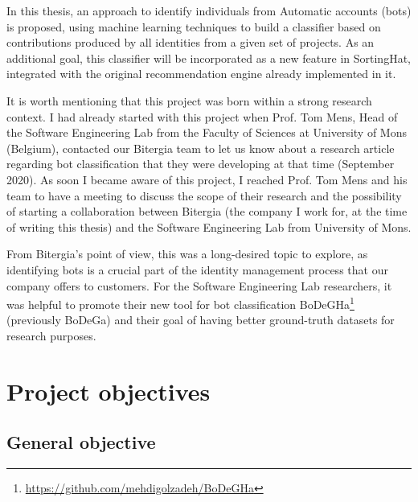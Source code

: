 \documentclass[a4paper, 12pt]{book}
\begin{document}
In this thesis, an approach to identify individuals from Automatic accounts (bots) is proposed, using machine learning techniques to build a classifier based on contributions produced by all identities from a given set of projects. As an additional goal, this classifier will be incorporated as a new feature in SortingHat, integrated with the original recommendation engine already implemented in it.

It is worth mentioning that this project was born within a strong research context. I had already started with this project when Prof. Tom Mens, Head of the Software Engineering Lab from the Faculty of Sciences at University of Mons (Belgium), contacted our Bitergia team to let us know about a research article regarding bot classification that they were developing at that time (September 2020). As soon I became aware of this project, I reached Prof. Tom Mens and his team to have a meeting to discuss the scope of their research and the possibility of starting a collaboration between Bitergia (the company I work for, at the time of writing this thesis) and the Software Engineering Lab from University of Mons. 

From Bitergia's point of view, this was a long-desired topic to explore, as identifying bots is a crucial part of the identity management process that our company offers to customers. For the Software Engineering Lab researchers, it was helpful to promote their new tool for bot classification BoDeGHa\footnote{\url{https://github.com/mehdigolzadeh/BoDeGHa}} (previously BoDeGa) and their goal of having better ground-truth datasets for research purposes.



\section{Project objectives}
\label{sec:objectives}

\subsection{General objective} %
\label{ssec:general-objective} %
\end{document}
